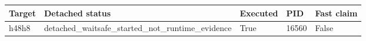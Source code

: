 {\small
\begin{tabular}{lllll}
\hline
Target & Detached status & Executed & PID & Fast claim \\
\hline
h48h8 & detached\_waitsafe\_started\_not\_runtime\_evidence & True & 16560 & False \\
\hline
\end{tabular}
}
